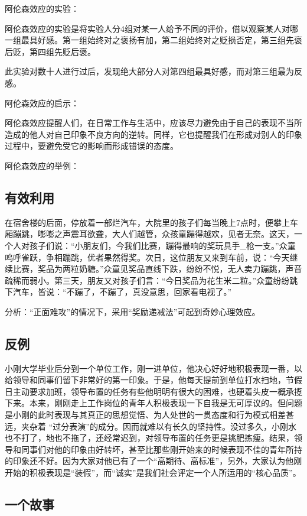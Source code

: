 \documentclass[11pt]{ctexart}
\begin{document}
阿伦森效应的实验：

阿伦森效应的实验是将实验人分4组对某一人给予不同的评价，借以观察某人对哪一组最具好感。第一组始终对之褒扬有加，第二组始终对之贬损否定，第三组先褒后贬，第四组先贬后褒。

此实验对数十人进行过后，发现绝大部分人对第四组最具好感，而对第三组最为反感。

阿伦森效应的启示：

阿伦森效应提醒人们，在日常工作与生活中，应该尽力避免由于自己的表现不当所造成的他人对自己印象不良方向的逆转。同样，它也提醒我们在形成对别人的印象过程中，要避免受它的影响而形成错误的态度。

阿伦森效应的举例：
\subsection{有效利用}
\label{sec-2-1}


在宿舍楼的后面，停放着一部烂汽车，大院里的孩子们每当晚上7点时，便攀上车厢蹦跳，嘭嘭之声震耳欲聋，大人们越管，众孩童蹦得越欢，见者无奈。这天，一个人对孩子们说：“小朋友们，今我们比赛，蹦得最响的奖玩具手_枪一支。”众童呜呼雀跃，争相蹦跳，优者果然得奖。次日，这位朋友又来到车前，说：“今天继续比赛，奖品为两粒奶糖。”众童见奖品直线下跌，纷纷不悦，无人卖力蹦跳，声音疏稀而弱小。第三天，朋友又对孩子们言：“今日奖品为花生米二粒。”众童纷纷跳下汽车，皆说：“不蹦了，不蹦了，真没意思，回家看电视了。”

分析：“正面难攻”的情况下，采用“奖励递减法”可起到奇妙心理效应。
\subsection{反例}
\label{sec-2-2}


小刚大学毕业后分到一个单位工作，刚一进单位，他决心好好地积极表现一番，以给领导和同事们留下非常好的第一印象。于是，他每天提前到单位打水扫地，节假日主动要求加班，领导布置的任务有些他明明有很大的困难，也硬着头皮一概承揽下来。本来，刚刚走上工作岗位的青年人积极表现一下自我是无可厚议的。但问题是小刚的此时表现与其真正的思想觉悟、为人处世的一贯态度和行为模式相差甚远，夹杂着 “过分表演”的成分。因而就难以有长久的坚持性。没过多久，小刚水也不打了，地也不拖了，还经常迟到，对领导布置的任务更是挑肥拣瘦。结果，领导和同事们对他的印象由好转坏，甚至比那些刚开始来的时候表现不佳的青年所持的印象还不好。因为大家对他已有了一个“高期待、高标准”，另外，大家认为他刚开始的积极表现是“装假”，而“诚实”是我们社会评定一个人所运用的“核心品质”。
\subsection{一个故事}
\label{sec-2-3}
\end{document}
